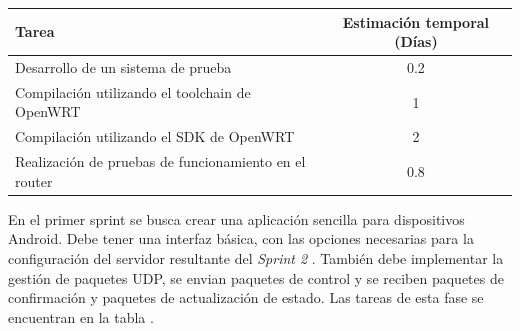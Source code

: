 \documentclass[12pt]{article}
\begin{document}
            \begin{tabular}{|l|c|}
                \hline
                \textbf{Tarea}                                                              &   \textbf{Estimación temporal} (Días) \\           
                \hline
                Desarrollo de un sistema de prueba                                          &   0.2                                 \\
                Compilación utilizando el toolchain de OpenWRT                              &   1                                   \\
                Compilación utilizando el SDK de OpenWRT                                    &   2                                   \\
                Realización de pruebas de funcionamiento en el router                       &   0.8                                 \\
                \hline
            \end{tabular}

            En el primer sprint se busca crear una aplicación sencilla para dispositivos Android. Debe tener una interfaz básica, con las opciones necesarias para la configuración del servidor resultante del \textit{Sprint 2} . También debe implementar la gestión de paquetes UDP, se envian paquetes de control y se reciben paquetes de confirmación y paquetes de actualización de estado. Las tareas de esta fase se encuentran en la tabla .
\end{document}
